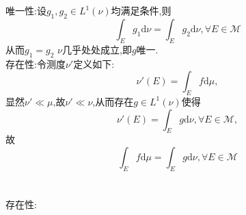 \documentclass[]{article}
\title{}
\author{}
\begin{document}
\section{}
\noindent 唯一性:设$g_1,g_2\in L^1(\nu)$均满足条件,则$$\int_{E}g_1\mathrm{d}\nu=\int_{E}g_2\mathrm{d}\nu,\forall E\in \mathcal{M}$$ 从而$g_1=g_2$ $\nu$几乎处处成立,即$g$唯一.\\
存在性:令测度$\nu'$定义如下:$$\nu'(E)=\int_{E}f\mathrm{d}\mu,$$显然$\nu'\ll \mu$,故$\nu'\ll \nu$,从而存在$g\in L^1(\nu)$使得$$\nu'(E)=\int_{E}g\mathrm{d}\nu,\forall E\in \mathcal{M},$$故$$\int_{E}f\mathrm{d}\mu=\int_{E}g\mathrm{d}\nu,\forall E\in \mathcal{M}$$
\section{}
\noindent 存在性:
\end{document}
